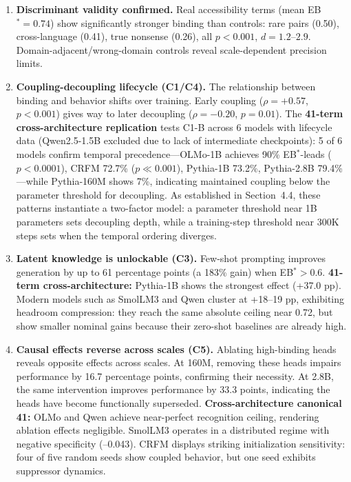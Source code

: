\documentclass[10pt]{article} %
\begin{document}
\begin{enumerate}
  \item \textbf{Discriminant validity confirmed.} Real accessibility terms (mean EB$^*=0.74$) show significantly stronger binding than controls: rare pairs (0.50), cross-language (0.41), true nonsense (0.26), all $p<0.001$, $d=1.2$--$2.9$. Domain-adjacent/wrong-domain controls reveal scale-dependent precision limits.

  \item \textbf{Coupling-decoupling lifecycle (C1/C4).} The relationship between binding and behavior shifts over training. Early coupling ($\rho=+0.57$, $p<0.001$) gives way to later decoupling ($\rho=-0.20$, $p=0.01$).
  The \textbf{41-term cross-architecture replication} tests C1-B across 6 models with lifecycle data (Qwen2.5-1.5B excluded due to lack of intermediate checkpoints): 5 of 6 models confirm temporal precedence---OLMo-1B achieves 90\% EB$^*$-leads ($p<0.0001$), CRFM 72.7\% ($p \ll 0.001$), Pythia-1B 73.2\%, Pythia-2.8B 79.4\%---while Pythia-160M shows 7\%, indicating maintained coupling below the parameter threshold for decoupling.
  As established in Section~4.4, these patterns instantiate a two-factor model: a parameter threshold near 1B parameters sets decoupling depth, while a training-step threshold near 300K steps sets when the temporal ordering diverges.

  \item \textbf{Latent knowledge is unlockable (C3).} Few-shot prompting improves generation by up to 61 percentage points (a 183\% gain) when EB$^*>0.6$.
  \textbf{41-term cross-architecture:} Pythia-1B shows the strongest effect (+37.0 pp). Modern models such as SmolLM3 and Qwen cluster at +18--19 pp, exhibiting headroom compression: they reach the same absolute ceiling near 0.72, but show smaller nominal gains because their zero-shot baselines are already high.

  \item \textbf{Causal effects reverse across scales (C5).} Ablating high-binding heads reveals opposite effects across scales. At 160M, removing these heads impairs performance by 16.7 percentage points, confirming their necessity. At 2.8B, the same intervention improves performance by 33.3 points, indicating the heads have become functionally superseded.
  \textbf{Cross-architecture canonical 41:} OLMo and Qwen achieve near-perfect recognition ceiling, rendering ablation effects negligible. SmolLM3 operates in a distributed regime with negative specificity (--0.043). CRFM displays striking initialization sensitivity: four of five random seeds show coupled behavior, but one seed exhibits suppressor dynamics.
\end{enumerate}
\end{document}
